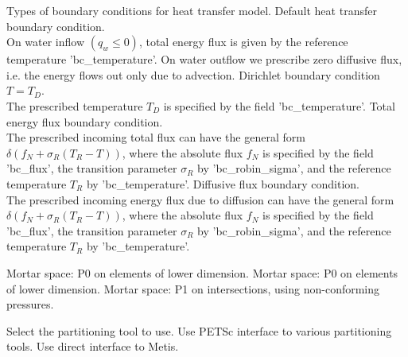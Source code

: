 \begin{SelectionType}
	{}
	{{{Types of boundary conditions for heat transfer model.}}}
		\KeyItem
			{}
			{{{Default heat transfer boundary condition.}\\{
On water inflow }{$(q_w \le 0)$}{, total energy flux is given by the reference temperature 'bc{\_}temperature'. On water outflow we prescribe zero diffusive flux, i.e. the energy flows out only due to advection.}}}
		\KeyItem
			{}
			{{{Dirichlet boundary condition }{$T = T_D $}{.}\\{
The prescribed temperature }{$T_D$}{ is specified by the field 'bc{\_}temperature'.}}}
		\KeyItem
			{}
			{{{Total energy flux boundary condition.}\\{
The prescribed incoming total flux can have the general form }{$\delta(f_N+\sigma_R(T_R-T) )$}{, where the absolute flux }{$f_N$}{ is specified by the field 'bc{\_}flux', the transition parameter }{$\sigma_R$}{ by 'bc{\_}robin{\_}sigma', and the reference temperature }{$T_R$}{ by 'bc{\_}temperature'.}}}
		\KeyItem
			{}
			{{{Diffusive flux boundary condition.}\\{
The prescribed incoming energy flux due to diffusion can have the general form }{$\delta(f_N+\sigma_R(T_R-T) )$}{, where the absolute flux }{$f_N$}{ is specified by the field 'bc{\_}flux', the transition parameter }{$\sigma_R$}{ by 'bc{\_}robin{\_}sigma', and the reference temperature }{$T_R$}{ by 'bc{\_}temperature'.}}}
\end{SelectionType}
\begin{SelectionType}
	{}
	{}
		\KeyItem
			{}
			{{{Mortar space: P0 on elements of lower dimension.}}}
		\KeyItem
			{}
			{{{Mortar space: P0 on elements of lower dimension.}}}
		\KeyItem
			{}
			{{{Mortar space: P1 on intersections, using non-conforming pressures.}}}
\end{SelectionType}
\begin{SelectionType}
	{}
	{{{Select the partitioning tool to use.}}}
		\KeyItem
			{}
			{{{Use PETSc interface to various partitioning tools.}}}
		\KeyItem
			{}
			{{{Use direct interface to Metis.}}}
\end{SelectionType}
